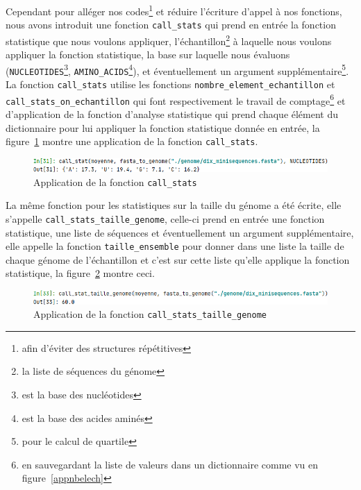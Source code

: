 \documentclass[12pt]{article}
\begin{document}
Cependant pour alléger nos codes\footnote{afin d'éviter des structures répétitives} et réduire l'écriture d'appel à nos fonctions, nous avons introduit une fonction \texttt{call\_stats} qui prend en entrée la fonction statistique que nous voulons appliquer, l'échantillon\footnote{la liste de séquences du génome} à laquelle nous voulons appliquer la fonction statistique, la base sur laquelle nous évaluons (\texttt{NUCLEOTIDES}\footnote{est la base des nucléotides}, \texttt{AMINO\_ACIDS}\footnote{est la base des acides aminés}), et éventuellement un argument supplémentaire\footnote{pour le calcul de quartile}. La fonction \texttt{call\_stats} utilise les fonctions \texttt{nombre\_element\_echantillon} et \texttt{call\_stats\_on\_echantillon} qui font respectivement le travail de comptage\footnote{en sauvegardant la liste de valeurs dans un dictionnaire comme vu en figure~\ref{appnbelech}} et d'application de la fonction d'analyse statistique qui prend chaque élément du dictionnaire pour lui appliquer la fonction statistique donnée en entrée, la figure~\ref{appcallstats} montre une application de la fonction \texttt{call\_stats}.
    \begin{figure}[!h]
        \centering
        \includegraphics[scale = 0.85]{Images/Stats/app_call_stats.PNG}
        \caption{Application de la fonction \texttt{call\_stats}}
        \label{appcallstats}
    \end{figure}

La même fonction pour les statistiques sur la taille du génome a été écrite, elle s'appelle \texttt{call\_stats\_taille\_genome}, celle-ci prend en entrée une fonction statistique, une liste de séquences et éventuellement un argument supplémentaire, elle appelle la fonction \texttt{taille\_ensemble} pour donner dans une liste la taille de chaque génome de l'échantillon et c'est sur cette liste qu'elle applique la fonction statistique, la figure~\ref{appcallstatstaille} montre ceci.
    \begin{figure}[!h]
        \centering
        \includegraphics[scale = 0.85]{Images/Stats/app_call_stats_taille_genome.PNG}
        \caption{Application de la fonction \texttt{call\_stats\_taille\_genome}}
        \label{appcallstatstaille}
    \end{figure}
\end{document}
